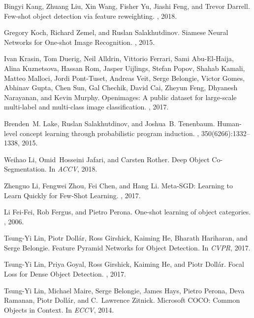 \documentclass{article}
\begin{document}
{\begin{thebibliography}{10}
Bingyi Kang, Zhuang Liu, Xin Wang, Fisher Yu, Jiashi Feng, and Trevor Darrell.
\newblock Few-shot object detection via feature reweighting.
, 2018.

Gregory Koch, Richard Zemel, and Ruslan Salakhutdinov.
\newblock Siamese {Neural} {Networks} for {One}-shot {Image} {Recognition}.
, 2015.

Ivan Krasin, Tom Duerig, Neil Alldrin, Vittorio Ferrari, Sami Abu-El-Haija,
  Alina Kuznetsova, Hassan Rom, Jasper Uijlings, Stefan Popov, Shahab Kamali,
  Matteo Malloci, Jordi Pont-Tuset, Andreas Veit, Serge Belongie, Victor Gomes,
  Abhinav Gupta, Chen Sun, Gal Chechik, David Cai, Zheyun Feng, Dhyanesh
  Narayanan, and Kevin Murphy.
\newblock Openimages: A public dataset for large-scale multi-label and
  multi-class image classification.
, 2017.

Brenden~M. Lake, Ruslan Salakhutdinov, and Joshua~B. Tenenbaum.
\newblock Human-level concept learning through probabilistic program induction.
, 350(6266):1332--1338, 2015.

Weihao Li, Omid~Hosseini Jafari, and Carsten Rother.
\newblock Deep {Object} {Co}-{Segmentation}.
\newblock In {\em {ACCV}}, 2018.

Zhenguo Li, Fengwei Zhou, Fei Chen, and Hang Li.
\newblock Meta-{SGD}: {Learning} to {Learn} {Quickly} for {Few}-{Shot}
  {Learning}.
, 2017.

{Li Fei-Fei}, Rob {Fergus}, and Pietro {Perona}.
\newblock One-shot learning of object categories.
, 2006.

Tsung-Yi Lin, Piotr Dollár, Ross Girshick, Kaiming He, Bharath Hariharan, and
  Serge Belongie.
\newblock Feature {Pyramid} {Networks} for {Object} {Detection}.
\newblock In {\em {CVPR}}, 2017.

Tsung-Yi Lin, Priya Goyal, Ross Girshick, Kaiming He, and Piotr Dollár.
\newblock Focal {Loss} for {Dense} {Object} {Detection}.
, 2017.

Tsung-Yi Lin, Michael Maire, Serge Belongie, James Hays, Pietro Perona, Deva
  Ramanan, Piotr Dollár, and C.~Lawrence Zitnick.
\newblock Microsoft {COCO}: {Common} {Objects} in {Context}.
\newblock In {\em {ECCV}}, 2014.


\end{thebibliography}}
\end{document}
